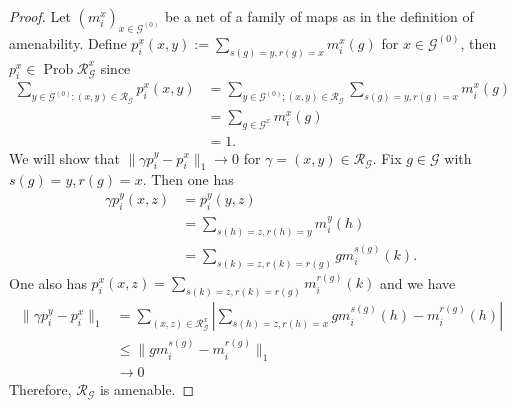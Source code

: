 \documentclass[10pt,a4paper]{amsart}
\newcommand{\G}{\mathcal{G}}
\newcommand{\Prob}[1]{\operatorname{Prob}{#1}}
\newcommand{\R}{\mathcal{R}}
\begin{document}
\begin{proof}
Let $(m_i^x)_{x \in \G^{(0)}}$ be a net of a family of maps as in the definition of amenability.
Define $\displaystyle p_i^x (x, y) := \sum _{s(g)=y, r(g)=x} m_i^x(g)$ for $x \in \G^{(0)}$, then $p_i^x \in \Prob \R_\G^x$ since
\begin{align*}
\sum_{y \in \G^{(0)}; (x, y) \in \R _\G} p_i^x (x, y) &= \sum _{y \in \G^{(0)}; (x, y) \in \R _\G} \sum_{s(g)=y, r(g)=x} m_i^x(g) \\
&= \sum _{g \in \G ^x} m_i^x (g) \\
&=1.
\end{align*}
We will show that $\| \gamma p_i^y - p_i^x \|_1 \to 0$ for $\gamma = (x, y) \in \R_\G$.
Fix $g \in \G$ with $s(g) = y, r(g) = x$.
Then one has
\begin{align*}
\gamma p_i^y (x, z) &= p_i^y (y, z) \\
&= \sum_{s(h)=z, r(h)=y} m_i^y(h) \\
&= \sum_{s(k)=z, r(k)=r(g)} gm_i^{s(g)}(k).
\end{align*}
One also has $\displaystyle p_i^x(x,z) = \sum_{s(k)=z, r(k)=r(g)} m_i^{r(g)}(k)$ and we have
\begin{align*}
\| \gamma p_i^y - p_i^x \|_1 &= \sum_{(x, z) \in \R_\G^x} \left| \sum_{s(h)=z, r(h)=x} gm_i^{s(g)}(h) - m_i^{r(g)}(h) \right| \\
& \leq \| gm_i^{s(g)} - m_i^{r(g)} \|_1 \\
&\to 0
\end{align*}
Therefore, $\R_\G$ is amenable.
\end{proof}
\end{document}
